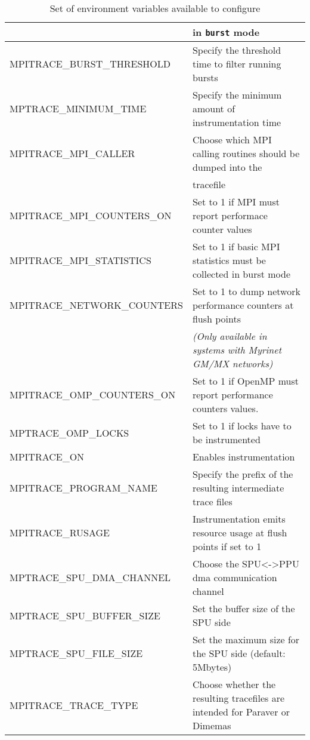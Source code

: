 \begin{table}[!ht]
{\begin{tabular}{| l | l |}
                          & in {\tt burst} mode\\
  \hline
  MPITRACE\_BURST\_THRESHOLD & Specify the threshold time to filter running bursts\\
  \hline
  MPTRACE\_MINIMUM\_TIME & Specify the minimum amount of instrumentation time\\
  \hline
  MPITRACE\_MPI\_CALLER & Choose which MPI calling routines should be dumped into the\\
                        & tracefile\\
  \hline
  MPITRACE\_MPI\_COUNTERS\_ON & Set to 1 if MPI must report performace counter values\\
  \hline 
  MPITRACE\_MPI\_STATISTICS & Set to 1 if basic MPI statistics must be collected in burst mode\\
  \hline
  MPITRACE\_NETWORK\_COUNTERS & Set to 1 to dump network performance counters at flush points\\
                              & {\em (Only available in systems with Myrinet GM/MX networks)}\\
  \hline
  MPITRACE\_OMP\_COUNTERS\_ON & Set to 1 if OpenMP must report performance counters values. \\
  \hline
  MPTRACE\_OMP\_LOCKS & Set to 1 if locks have to be instrumented\\
  \hline 
  MPITRACE\_ON & Enables instrumentation\\
  \hline
  MPITRACE\_PROGRAM\_NAME & Specify the prefix of the resulting intermediate trace files\\ 
  \hline
  MPITRACE\_RUSAGE & Instrumentation emits resource usage at flush points if set to 1\\
  \hline
  MPTRACE\_SPU\_DMA\_CHANNEL & Choose the SPU<->PPU dma communication channel\\
  \hline
  MPTRACE\_SPU\_BUFFER\_SIZE & Set the buffer size of the SPU side\\
  \hline 
  MPTRACE\_SPU\_FILE\_SIZE & Set the maximum size for the SPU side (default: 5Mbytes)\\
  \hline
  MPITRACE\_TRACE\_TYPE & Choose whether the resulting tracefiles are intended for Paraver or Dimemas\\
  \hline
\end{tabular}
}
\caption{Set of environment variables available to configure \TRACE}
\label{tab:EnvironmentVariables}
\end{table}

